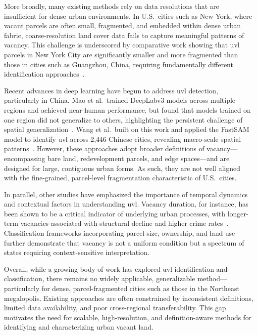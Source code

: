 More broadly, many existing methods rely on data resolutions that are insufficient for dense urban environments. In U.S.\ cities such as New York, where vacant parcels are often small, fragmented, and embedded within dense urban fabric, coarse-resolution land cover data fails to capture meaningful patterns of vacancy. This challenge is underscored by comparative work showing that \acrshort{uvl} parcels in New York City are significantly smaller and more fragmented than those in cities such as Guangzhou, China, requiring fundamentally different identification approaches~\cite{song2020Urban}.

Recent advances in deep learning have begun to address \acrshort{uvl} detection, particularly in China. Mao et al.\ trained DeepLabv3 models across multiple regions and achieved near-human performance, but found that models trained on one region did not generalize to others, highlighting the persistent challenge of spatial generalization~\cite{mao2022Largescale}. Wang et al.\ built on this work and applied the FastSAM model to identify \acrshort{uvl} across 2,446 Chinese cities, revealing macro-scale spatial patterns~\cite{wang2026Urban}. However, these approaches adopt broader definitions of vacancy---encompassing bare land, redevelopment parcels, and edge spaces---and are designed for large, contiguous urban forms. As such, they are not well aligned with the fine-grained, parcel-level fragmentation characteristic of U.S.\ cities.

In parallel, other studies have emphasized the importance of temporal dynamics and contextual factors in understanding \acrshort{uvl}. Vacancy duration, for instance, has been shown to be a critical indicator of underlying urban processes, with longer-term vacancies associated with structural decline and higher crime rates~\cite{zhangPersistence}. Classification frameworks incorporating parcel size, ownership, and land use further demonstrate that vacancy is not a uniform condition but a spectrum of states requiring context-sensitive interpretation.

Overall, while a growing body of work has explored \acrshort{uvl} identification and classification, there remains no widely applicable, generalizable method---particularly for dense, parcel-fragmented cities such as those in the Northeast megalopolis. Existing approaches are often constrained by inconsistent definitions, limited data availability, and poor cross-regional transferability. This gap motivates the need for scalable, high-resolution, and definition-aware methods for identifying and characterizing urban vacant land.

